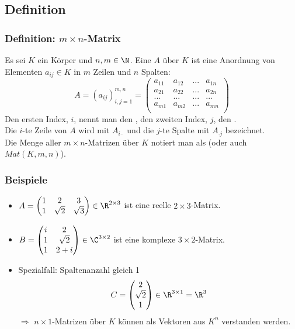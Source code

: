\subsection{Definition}
%
\begin{frame}\frametitle{Definition: $m \times n$-Matrix}
Es sei $K$ ein Körper und $n,m \in \N$. Eine  $A$ über $K$ ist eine Anordnung von Elementen $a_{ij} \in K$ in $m$ Zeilen und $n$ Spalten:
$$
A=(a_{ij})_{i , j=1}^{m,n}=\begin{pmatrix}
					a_{11} & a_{12} & ... &a_{1n} \\ 
					a_{21} & a_{22} & ... &a_{2n} \\ 
					... & ...&...&... \\ 
					a_{m1} & a_{m2} & ... &a_{mn} \\ 
			  \end{pmatrix}
$$
Den ersten Index, $i$, nennt man den , den zweiten Index, $j$, den .\\\pause
Die $i$-te Zeile von $A$ wird mit $A_{i\cdot}$ und die $j$-te Spalte mit $A_{\cdot j}$ bezeichnet.\\
Die Menge aller $m\times n$-Matrizen über $K$ notiert man als  (oder auch $Mat(K,m,n)$).
\end{frame}
%
\begin{frame}\frametitle{Beispiele}
\begin{itemize}
\item $A=\begin{pmatrix} 1 & 2 & 3 \\ 1 & \sqrt{2} & \sqrt{3} \end{pmatrix} \in \R^{2\times 3}$ ist eine reelle $2\times 3$-Matrix.\pause
\vfill
\item $B=\begin{pmatrix} i & 2  \\ 1 & \sqrt{2} \\ 1 & 2+i \end{pmatrix} \in \C^{3\times 2}$ ist eine komplexe $3\times 2$-Matrix.\pause
\vfill
\item Spezialfall: Spaltenanzahl gleich 1
$$
C=\begin{pmatrix}  2  \\  \sqrt{2} \\ 1 \end{pmatrix} \in \R^{3\times 1}=\R^3
$$\pause
$\Rightarrow$ $n\times 1$-Matrizen über $K$ können als Vektoren aus $K^n$ verstanden werden.

\end{itemize}
\end{frame}
%
